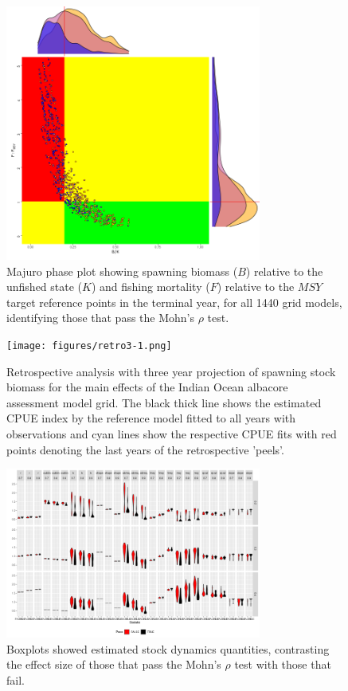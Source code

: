 \begin{figure}[ht!]\centering\includegraphics[width=0.75\textwidth]{figures/majuro-mohn-1.png}    
\caption{Majuro phase plot showing spawning biomass ($B$) relative to the unfished state ($K$) and fishing mortality ($F$) relative to the $MSY$ target reference points in the terminal year, for all 1440 grid models, identifying those that pass the Mohn's $\rho$ test.}
\label{fig:majuro}     
\end{figure}

\begin{figure}[ht!]\centering\texttt{[image: figures/retro3-1.png]}  
\caption{Retrospective analysis with three year projection of spawning stock biomass for the main effects of the Indian Ocean albacore assessment model grid. The black thick line shows the estimated CPUE index by the reference model fitted to all years with observations and cyan lines show the respective CPUE fits with red points denoting the last years of the retrospective 'peels'.}
\label{fig:retro3}      
\end{figure}

\begin{figure}[ht!]\centering\includegraphics[width=0.75\textwidth]{figures/param-box-mohn-1.png} \caption{Boxplots showed estimated stock dynamics quantities, contrasting the effect size of those that pass the Mohn's $\rho$ test with those that fail.}
\label{fig:param-box-1}       
\end{figure}

